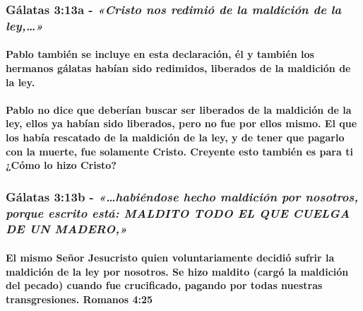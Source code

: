 \documentclass[11a pt,twoside]{article}
\newcommand{\scripture}[1]{%
  {\fontsize{12pt}{16pt}\selectfont\ScriptureFont\itshape #1}%
}
\let\oldsubsubsection\subsubsection
\renewcommand{\subsubsection}{\needspace{4\baselineskip}\oldsubsubsection}
\let\oldparagraph\paragraph
\renewcommand{\paragraph}{\needspace{3\baselineskip}\oldparagraph}
\begin{document}
\subsubsection{\texorpdfstring{Gálatas 3:13a -
\scripture{«Cristo nos redimió de la maldición de la ley,…»}}{Gálatas 3:13a - }}\label{guxe1latas-313a---cristo-nos-redimiuxf3-de-la-maldiciuxf3n-de-la-ley}

\paragraph{Pablo también se incluye en esta declaración, él y también
los hermanos gálatas habían sido redimidos, liberados de la maldición de
la
ley.}\label{pablo-tambiuxe9n-se-incluye-en-esta-declaraciuxf3n-uxe9l-y-tambiuxe9n-los-hermanos-guxe1latas-habuxedan-sido-redimidos-liberados-de-la-maldiciuxf3n-de-la-ley.}

\paragraph{Pablo no dice que deberían buscar ser liberados de la
maldición de la ley, ellos ya habían sido liberados, pero no fue por
ellos mismo. El que los había rescatado de la maldición de la ley, y de
tener que pagarlo con la muerte, fue solamente Cristo. Creyente esto
también es para ti ¿Cómo lo hizo
Cristo?}\label{pablo-no-dice-que-deberuxedan-buscar-ser-liberados-de-la-maldiciuxf3n-de-la-ley-ellos-ya-habuxedan-sido-liberados-pero-no-fue-por-ellos-mismo.-el-que-los-habuxeda-rescatado-de-la-maldiciuxf3n-de-la-ley-y-de-tener-que-pagarlo-con-la-muerte-fue-solamente-cristo.-creyente-esto-tambiuxe9n-es-para-ti-cuxf3mo-lo-hizo-cristo}

\subsubsection{\texorpdfstring{Gálatas 3:13b -
\scripture{«…habiéndose hecho maldición por nosotros, porque escrito está: MALDITO TODO EL QUE CUELGA DE UN MADERO,»}}{Gálatas 3:13b - }}\label{guxe1latas-313b---habiuxe9ndose-hecho-maldiciuxf3n-por-nosotros-porque-escrito-estuxe1-maldito-todo-el-que-cuelga-de-un-madero}

\paragraph{El mismo Señor Jesucristo quien voluntariamente decidió
sufrir la maldición de la ley por nosotros. Se hizo maldito (cargó la
maldición del pecado) cuando fue crucificado, pagando por todas nuestras
transgresiones. Romanos
4:25}\label{el-mismo-seuxf1or-jesucristo-quien-voluntariamente-decidiuxf3-sufrir-la-maldiciuxf3n-de-la-ley-por-nosotros.-se-hizo-maldito-carguxf3-la-maldiciuxf3n-del-pecado-cuando-fue-crucificado-pagando-por-todas-nuestras-transgresiones.-romanos-425}
\end{document}
